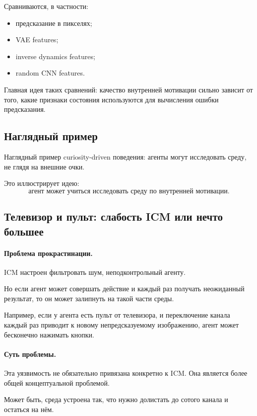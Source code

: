 \documentclass[12pt,a4paper]{article}
\begin{document}
Сравниваются, в частности:
\begin{itemize}
    \item предсказание в пикселях;
    \item VAE features;
    \item inverse dynamics features;
    \item random CNN features.
\end{itemize}

Главная идея таких сравнений: качество внутренней мотивации сильно зависит от того, какие признаки состояния используются для вычисления ошибки предсказания.

\subsection{Наглядный пример}

Наглядный пример curiosity-driven поведения: агенты могут исследовать среду, не глядя на внешние очки.

Это иллюстрирует идею:
\[
\text{агент может учиться исследовать среду по внутренней мотивации}.
\]

\subsection{Телевизор и пульт: слабость ICM или нечто большее}

\paragraph{Проблема прокрастинации.}

ICM настроен фильтровать шум, неподконтрольный агенту.

Но если агент может совершать действие и каждый раз получать неожиданный результат, то он может залипнуть на такой части среды.

Например, если у агента есть пульт от телевизора, и переключение канала каждый раз приводит к новому непредсказуемому изображению, агент может бесконечно нажимать кнопки.

\paragraph{Суть проблемы.}

Эта уязвимость не обязательно привязана конкретно к ICM. Она является более общей концептуальной проблемой.

Может быть, среда устроена так, что нужно долистать до сотого канала и остаться на нём.
\end{document}
